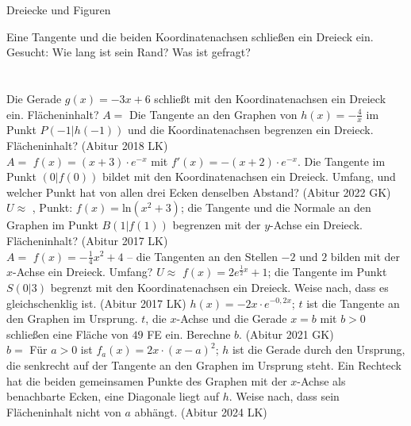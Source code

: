 \setcounter{aufgabe}{22}

\begin{aufgabe}{Dreiecke und Figuren}
\begin{teile}
\teil Eine Tangente und die beiden Koordinatenachsen schließen ein Dreieck ein. Gesucht: Wie lang ist sein Rand? Was ist gefragt? \\  \\  \\ 
\teil Die Gerade $g(x) = -3x + 6$ schließt mit den Koordinatenachsen ein Dreieck ein. Flächeninhalt? $A =$ \leerfeld
\teil Die Tangente an den Graphen von $h(x) = -\frac{4}{x}$ im Punkt $P(-1 | h(-1))$ und die Koordinatenachsen begrenzen ein Dreieck. Flächeninhalt? \hfill (Abitur 2018 LK) \\ $A =$ \leerfeld
\teil $f(x) = (x + 3) \cdot e^{-x}$ mit $f'(x) = -(x + 2) \cdot e^{-x}$. Die Tangente im Punkt $(0 | f(0))$ bildet mit den Koordinatenachsen ein Dreieck. Umfang, und welcher Punkt hat von allen drei Ecken denselben Abstand? \hfill (Abitur 2022 GK) \\ $U \approx$ \leerfeld , Punkt: \leerfeld
\teil $f(x) = \mathrm{ln}(x^2 + 3)$; die Tangente und die Normale an den Graphen im Punkt $B(1 | f(1))$ begrenzen mit der $y$-Achse ein Dreieck. Flächeninhalt? \hfill (Abitur 2017 LK) \\ $A =$ \leerfeld
\teil $f(x) = -\frac{1}{4}x^2 + 4$ – die Tangenten an den Stellen $-2$ und $2$ bilden mit der $x$-Achse ein Dreieck. Umfang? $U \approx$ \leerfeld
\teil $f(x) = 2e^{\frac{1}{2}x} + 1$; die Tangente im Punkt $S(0 | 3)$ begrenzt mit den Koordinatenachsen ein Dreieck. Weise nach, dass es gleichschenklig ist. \hfill (Abitur 2017 LK)
\teil $h(x) = -2x \cdot e^{-0{,}2x}$; $t$ ist die Tangente an den Graphen im Ursprung. $t$, die $x$-Achse und die Gerade $x = b$ mit $b > 0$ schließen eine Fläche von $49$ FE ein. Berechne $b$. \hfill (Abitur 2021 GK) \\ $b =$ \leerfeld
\teil Für $a > 0$ ist $f_a(x) = 2x \cdot (x - a)^2$; $h$ ist die Gerade durch den Ursprung, die senkrecht auf der Tangente an den Graphen im Ursprung steht. Ein Rechteck hat die beiden gemeinsamen Punkte des Graphen mit der $x$-Achse als benachbarte Ecken, eine Diagonale liegt auf $h$. Weise nach, dass sein Flächeninhalt nicht von $a$ abhängt. \hfill (Abitur 2024 LK)
\end{teile}
\end{aufgabe}

